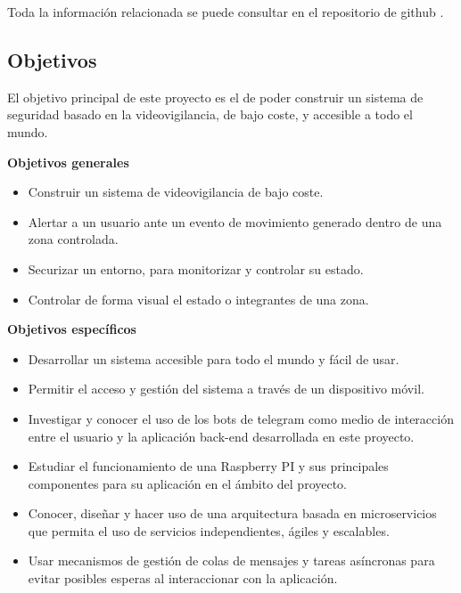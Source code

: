 Toda la información relacionada se puede consultar en el repositorio de github \cite{ref1}.

\subsection{Objetivos}

El objetivo principal de este proyecto es el de poder construir un sistema de seguridad basado en la videovigilancia, de bajo coste, y accesible a todo el mundo.

\textbf{Objetivos generales}

\vspace{-0.3cm}

\begin{itemize}
	\item Construir un sistema de videovigilancia de bajo coste.
	\item Alertar a un usuario ante un evento de movimiento generado dentro de una zona controlada.
	\item Securizar un entorno, para monitorizar y controlar su estado.
	\item Controlar de forma visual el estado o integrantes de una zona.
\end{itemize}

\textbf{Objetivos específicos}

\vspace{-0.3cm}

\begin{itemize}
	\item Desarrollar un sistema accesible para todo el mundo y fácil de usar.
	\item Permitir el acceso y gestión del sistema a través de un dispositivo móvil.
	\item Investigar y conocer el uso de los bots de telegram como medio de interacción entre el usuario y la aplicación back-end desarrollada en este proyecto.
	\item Estudiar el funcionamiento de una Raspberry PI y sus principales componentes para su aplicación en el ámbito del proyecto.
	\item Conocer, diseñar y hacer uso de una arquitectura basada en microservicios que permita el uso de servicios independientes, ágiles y escalables.
	\item Usar mecanismos de gestión de colas de mensajes y tareas asíncronas para evitar posibles esperas al interaccionar con la aplicación.

\end{itemize}

